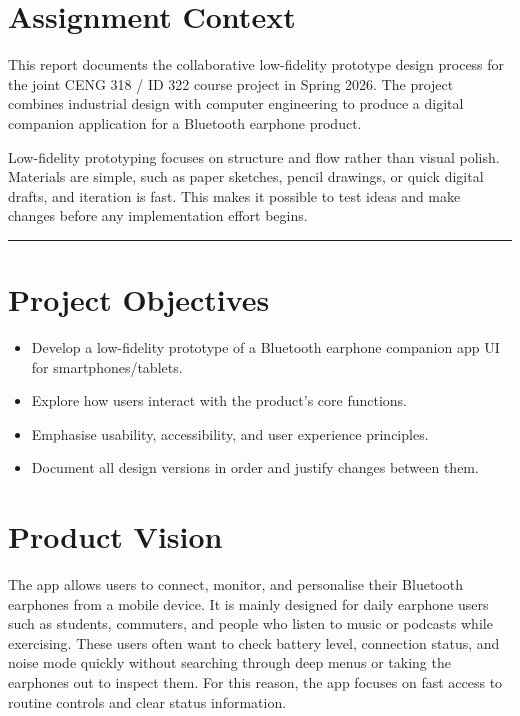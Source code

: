 \documentclass[12pt, a4paper]{report}
\newenvironment{highlight}{%
  \par\vspace{6pt}%
  \noindent%
  \begin{lrbox}{\hlbox}%
    \begin{minipage}{\dimexpr\linewidth-14pt\relax}%
      \vspace{6pt}\small%
}{%
      \vspace{6pt}%
    \end{minipage}%
  \end{lrbox}%
  \noindent\colorbox{lightgray}{%
    \hspace{2pt}%
    \textcolor{accentblue}{\rule[-0.2\baselineskip]{2pt}{\dimexpr\ht\hlbox+\dp\hlbox\relax}}%
    \hspace{8pt}\usebox{\hlbox}\hspace{2pt}%
  }%
  \par\vspace{6pt}%
}
\begin{document}
\section{Assignment Context}

This report documents the collaborative low-fidelity prototype design
process for the joint CENG 318 / ID 322 course project in Spring 2026. The
project combines industrial design with computer engineering to produce a digital
companion application for a Bluetooth earphone product.

\begin{highlight}
Low-fidelity prototyping focuses on structure and flow rather than
visual polish. Materials are simple, such as paper sketches, pencil drawings, or
quick digital drafts, and iteration is fast. This makes it possible to test ideas
and make changes before any implementation effort begins.
\end{highlight}

\section{Project Objectives}

\begin{itemize}
  \item Develop a low-fidelity prototype of a Bluetooth earphone companion app UI
    for smartphones/tablets.
  \item Explore how users interact with the product's core functions.
  \item Emphasise usability, accessibility, and user experience principles.
  \item Document all design versions in order and justify changes between them.
\end{itemize}

\section{Product Vision}

The app allows users to connect, monitor, and personalise their Bluetooth
earphones from a mobile device. It is mainly designed for daily earphone users such
as students, commuters, and people who listen to music or podcasts while exercising.
These users often want to check battery level, connection status, and noise mode
quickly without searching through deep menus or taking the earphones out to inspect
them. For this reason, the app focuses on fast access to routine controls and clear
status information.
\end{document}
